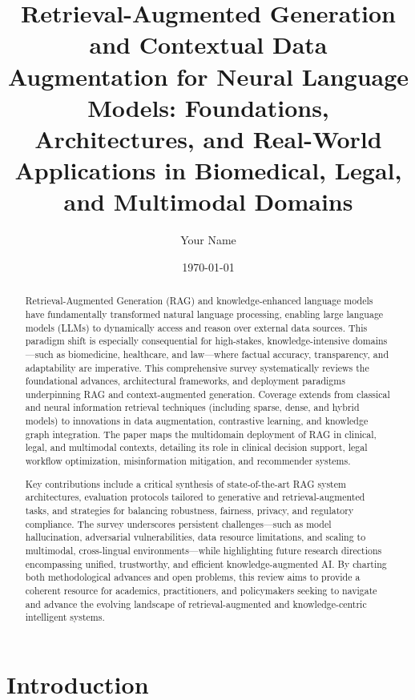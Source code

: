\documentclass[11pt]{article}
\begin{document}
\author{Your Name}
\date{\today}

\title{\title{Retrieval-Augmented Generation and Contextual Data Augmentation for Neural Language Models: Foundations, Architectures, and Real-World Applications in Biomedical, Legal, and Multimodal Domains}}
\maketitle

\begin{abstract}
Retrieval-Augmented Generation (RAG) and knowledge-enhanced language models have fundamentally transformed natural language processing, enabling large language models (LLMs) to dynamically access and reason over external data sources. This paradigm shift is especially consequential for high-stakes, knowledge-intensive domains—such as biomedicine, healthcare, and law—where factual accuracy, transparency, and adaptability are imperative. This comprehensive survey systematically reviews the foundational advances, architectural frameworks, and deployment paradigms underpinning RAG and context-augmented generation. Coverage extends from classical and neural information retrieval techniques (including sparse, dense, and hybrid models) to innovations in data augmentation, contrastive learning, and knowledge graph integration. The paper maps the multidomain deployment of RAG in clinical, legal, and multimodal contexts, detailing its role in clinical decision support, legal workflow optimization, misinformation mitigation, and recommender systems.

Key contributions include a critical synthesis of state-of-the-art RAG system architectures, evaluation protocols tailored to generative and retrieval-augmented tasks, and strategies for balancing robustness, fairness, privacy, and regulatory compliance. The survey underscores persistent challenges—such as model hallucination, adversarial vulnerabilities, data resource limitations, and scaling to multimodal, cross-lingual environments—while highlighting future research directions encompassing unified, trustworthy, and efficient knowledge-augmented AI. By charting both methodological advances and open problems, this review aims to provide a coherent resource for academics, practitioners, and policymakers seeking to navigate and advance the evolving landscape of retrieval-augmented and knowledge-centric intelligent systems.
\end{abstract}\section{Introduction}
\end{document}
